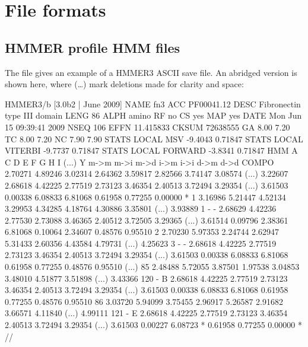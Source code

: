 \section{File formats}
\label{section:formats}
\setcounter{footnote}{0}

\subsection{HMMER profile HMM files}
\label{section:savefiles}

The file  gives an example of a HMMER3 ASCII
save file. An abridged version is shown here, where (\ldots) mark
deletions made for clarity and space:

\begin{tinysreoutput}
HMMER3/b [3.0b2 | June 2009]
NAME  fn3
ACC   PF00041.12
DESC  Fibronectin type III domain
LENG  86
ALPH  amino
RF    no
CS    yes
MAP   yes
DATE  Mon Jun 15 09:39:41 2009
NSEQ  106
EFFN  11.415833
CKSUM 72638555
GA    8.00 7.20
TC    8.00 7.20
NC    7.90 7.90
STATS LOCAL MSV       -9.4043  0.71847
STATS LOCAL VITERBI   -9.7737  0.71847
STATS LOCAL FORWARD   -3.8341  0.71847
HMM          A        C        D        E        F        G        H        I     (...)    Y   
            m->m     m->i     m->d     i->m     i->i     d->m     d->d
  COMPO   2.70271  4.89246  3.02314  2.64362  3.59817  2.82566  3.74147  3.08574  (...) 3.22607
          2.68618  4.42225  2.77519  2.73123  3.46354  2.40513  3.72494  3.29354  (...) 3.61503
          0.00338  6.08833  6.81068  0.61958  0.77255  0.00000        *
      1   3.16986  5.21447  4.52134  3.29953  4.34285  4.18764  4.30886  3.35801  (...) 3.93889      1 - -
          2.68629  4.42236  2.77530  2.73088  3.46365  2.40512  3.72505  3.29365  (...) 3.61514
          0.09796  2.38361  6.81068  0.10064  2.34607  0.48576  0.95510
      2   2.70230  5.97353  2.24744  2.62947  5.31433  2.60356  4.43584  4.79731  (...) 4.25623      3 - -
          2.68618  4.42225  2.77519  2.73123  3.46354  2.40513  3.72494  3.29354  (...) 3.61503
          0.00338  6.08833  6.81068  0.61958  0.77255  0.48576  0.95510
(...)
     85   2.48488  5.72055  3.87501  1.97538  3.04853  3.48010  4.51877  3.51898  (...) 3.43366    120 - B
          2.68618  4.42225  2.77519  2.73123  3.46354  2.40513  3.72494  3.29354  (...) 3.61503
          0.00338  6.08833  6.81068  0.61958  0.77255  0.48576  0.95510
     86   3.03720  5.94099  3.75455  2.96917  5.26587  2.91682  3.66571  4.11840  (...) 4.99111    121 - E
          2.68618  4.42225  2.77519  2.73123  3.46354  2.40513  3.72494  3.29354  (...) 3.61503
          0.00227  6.08723        *  0.61958  0.77255  0.00000        *
//
\end{tinysreoutput}

